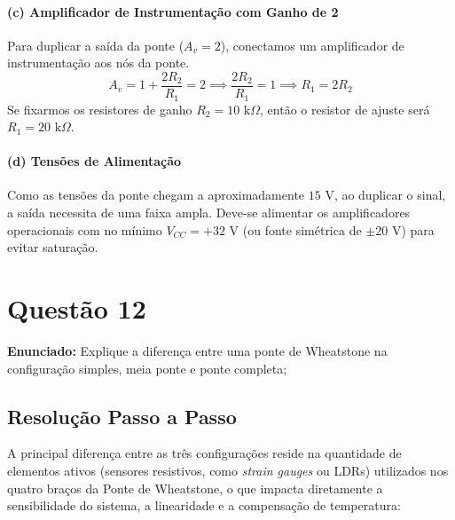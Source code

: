 \paragraph{(c) Amplificador de Instrumentação com Ganho de 2}
Para duplicar a saída da ponte ($A_v = 2$), conectamos um amplificador de instrumentação aos nós da ponte.
\begin{equation*}
    A_v = 1 + \frac{2 R_2}{R_1} = 2 \implies \frac{2 R_2}{R_1} = 1 \implies R_1 = 2 R_2
\end{equation*}
Se fixarmos os resistores de ganho $R_2 = 10\text{ k}\Omega$, então o resistor de ajuste será $R_1 = 20\text{ k}\Omega$.

\paragraph{(d) Tensões de Alimentação}
Como as tensões da ponte chegam a aproximadamente $15\text{ V}$, ao duplicar o sinal, a saída necessita de uma faixa ampla. Deve-se alimentar os amplificadores operacionais com no mínimo $V_{CC} = +32\text{ V}$ (ou fonte simétrica de $\pm 20\text{ V}$) para evitar saturação.

\newpage

\section*{Questão 12}
\textbf{Enunciado:} Explique a diferença entre uma ponte de Wheatstone na configuração simples, meia ponte e ponte completa;

\subsection*{Resolução Passo a Passo}
A principal diferença entre as três configurações reside na quantidade de elementos ativos (sensores resistivos, como \textit{strain gauges} ou LDRs) utilizados nos quatro braços da Ponte de Wheatstone, o que impacta diretamente a sensibilidade do sistema, a linearidade e a compensação de temperatura:

